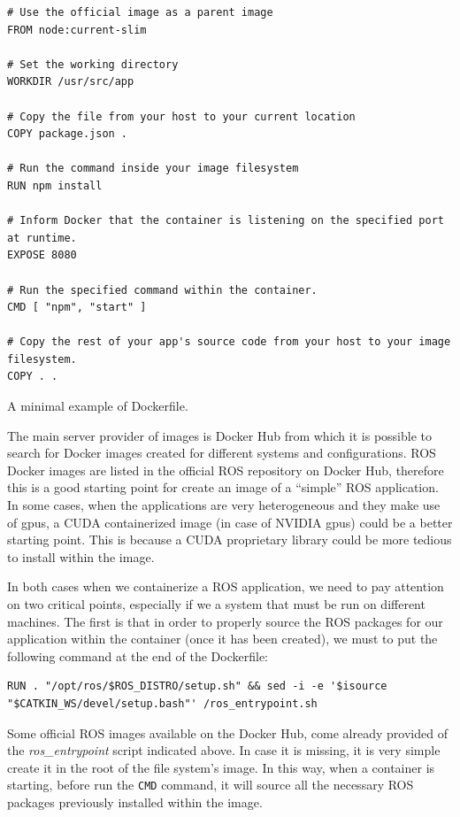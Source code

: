 \begin{listing}[H]
\begin{verbatim}
# Use the official image as a parent image
FROM node:current-slim

# Set the working directory
WORKDIR /usr/src/app

# Copy the file from your host to your current location
COPY package.json .

# Run the command inside your image filesystem
RUN npm install

# Inform Docker that the container is listening on the specified port at runtime.
EXPOSE 8080

# Run the specified command within the container.
CMD [ "npm", "start" ]

# Copy the rest of your app's source code from your host to your image filesystem.
COPY . .
\end{verbatim}
\caption{A minimal example of Dockerfile.}
\label{lst:dockerfilesample}
\end{listing}

The main server provider of images is Docker Hub \cite{DockerHub} from which it is possible to search for Docker images created for different systems and configurations.
ROS Docker images are listed in the official ROS repository on Docker Hub, therefore this is a good starting point for create an image of a ``simple'' ROS application.
In some cases, when the applications are very heterogeneous and they make use of gpus, a CUDA containerized image (in case of NVIDIA gpus) could be a better starting point.
This is because a CUDA proprietary library could be more tedious to install within the image.

In both cases when we containerize a ROS application, we need to pay attention on two critical points, especially if we a system that must be run on different machines.
The first is that in order to properly source the ROS packages for our application within the container (once it has been created), we must to put the following command at the end of the Dockerfile:

\begin{verbatim}
RUN . "/opt/ros/$ROS_DISTRO/setup.sh" && sed -i -e '$isource "$CATKIN_WS/devel/setup.bash"' /ros_entrypoint.sh
\end{verbatim}


Some official ROS images available on the Docker Hub, come already provided of the \textit{ros\_entrypoint} script indicated above. In case it is missing, it is very simple create it in the root of the file system's image. In this way, when a container is starting, before run the \texttt{CMD} command, it will source all the necessary ROS packages previously installed within the image.

